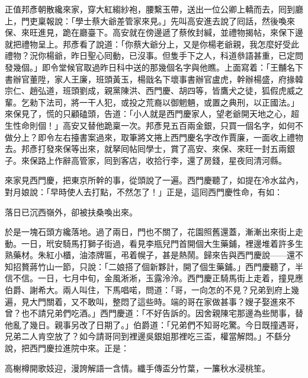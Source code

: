 正值邦彥朝散纔來家，穿大紅縐紗袍，腰繫玉帶，送出一位公卿上轎而去，囘到廳上，門吏稟報說：「學士蔡大爺差管家來見。」先叫高安進去說了囘話，然後喚來保、來旺進見，跪在廳臺下。高安就在傍邊遞了蔡攸封緘，並禮物揭帖，來保下邊就把禮物呈上。邦彥看了說道：「你蔡大爺分上，又是你楊老爺親，我怎麼好受此禮物？況你楊爺，昨日聖心囘動，已沒事。但隻手下之人，科道叅語甚重，已定問發幾個。」即令堂候官取過昨日科中送的那幾個名字與他瞧。上面寫着：「王黼名下書辦官董陞，家人王廉，班頭黃玉，楊戩名下壞事書辦官盧虎，幹辦楊盛，府掾韓宗仁、趙弘道，班頭劉成，親黨陳洪、西門慶、胡四等，皆鷹犬之徒，狐假虎威之輩。乞勑下法司，將一干人犯，或投之荒裔以御魍魎，或置之典刑，以正國法。」來保見了，慌的只顧磕頭，告道：「小人就是西門慶家人，望老爺開天地之心，超生性命則個！」高安又替他跪稟一次。邦彥見五百兩金銀，只買一個名字，如何不做分上？即令左右擡書案過來，取筆將文捲上西門慶名字改作賈廉，{}一面收上禮物去。邦彥打發來保等出來，就拏囘帖囘學士，賞了高安、來保、來旺一封五兩銀子。來保路上作辭高管家，囘到客店，收拾行李，還了房錢，星夜囘清河縣。

來家見西門慶，把東京所幹的事，從頭說了一遍。西門慶聽了，如提在冷水盆內，對月娘說：「早時使人去打點，不然怎了！」正是，這囘西門慶性命，有如：

落日已沉西嶺外，卻被扶桑喚出來。

於是一塊石頭方纔落地。過了兩日，門也不關了，花園照舊還蓋，漸漸出來街上走動。{}一日，玳安騎馬打獅子街過，看見李瓶兒門首開個大生藥鋪，裡邊堆着許多生熟藥材。朱紅小櫃，油漆牌匾，弔着幌子，甚是熱鬧。歸來告與西門慶說——還不知招贅蔣竹山一節，只說：「二娘搭了個新夥計，開了個生藥鋪。」{}西門慶聽了，半信不信。一日，七月中旬，金風淅淅，玉露泠泠。西門慶正騎馬街上走着，撞見應伯爵、謝希大。兩人叫住，下馬唱喏，問道：「哥，一向怎的不見？兄弟到府上幾遍，見大門關着，又不敢叫，整悶了這些時。端的哥在家做甚事？嫂子娶進來不曾？也不請兄弟們吃酒。」西門慶道：「不好告訴的。因舍親陳宅那邊為些閒事，替他亂了幾日。親事另改了日期了。」伯爵道：「兄弟們不知哥吃驚。今日既撞遇哥，兄弟二人肯空放了？如今請哥同到裡邊吳銀姐那裡吃三盃，權當解悶。」不繇分說，把西門慶拉進院中來。正是：

高榭樽開歌妓迎，漫誇解語一含情。纖手傳盃分竹葉，一簾秋水浸桃笙。

